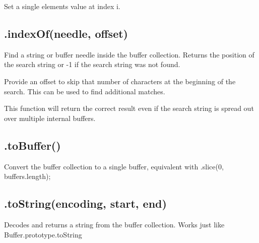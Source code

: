 Set a single element\textquotesingle{}s value at index {\ttfamily i}.

\subsection*{.index\+Of(needle, offset) }

Find a string or buffer {\ttfamily needle} inside the buffer collection. Returns the position of the search string or -\/1 if the search string was not found.

Provide an {\ttfamily offset} to skip that number of characters at the beginning of the search. This can be used to find additional matches.

This function will return the correct result even if the search string is spread out over multiple internal buffers.

\subsection*{.to\+Buffer() }

Convert the buffer collection to a single buffer, equivalent with {\ttfamily .slice(0, buffers.\+length)};

\subsection*{.to\+String(encoding, start, end) }

Decodes and returns a string from the buffer collection. Works just like {\ttfamily Buffer.\+prototype.\+to\+String} 